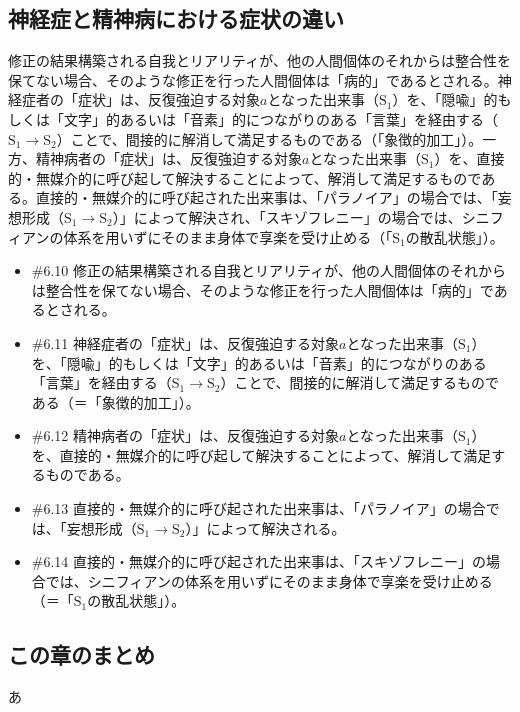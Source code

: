 \subsection{神経症と精神病における症状の違い}\label{ux795eux7d4cux75c7ux3068ux7cbeux795eux75c5ux306bux304aux3051ux308bux75c7ux72b6ux306eux9055ux3044}

修正の結果構築される自我とリアリティが、他の人間個体のそれからは整合性を保てない場合、そのような修正を行った人間個体は「病的」であるとされる。神経症者の「症状」は、反復強迫する対象\(a\)となった出来事（\(\textrm{S}_1\)）を、「隠喩」的もしくは「文字」的あるいは「音素」的につながりのある「言葉」を経由する（\(\textrm{S}_1\rightarrow\textrm{S}_2\)）ことで、間接的に解消して満足するものである（「象徴的加工」）。一方、精神病者の「症状」は、反復強迫する対象\(a\)となった出来事（\(\textrm{S}_1\)）を、直接的・無媒介的に呼び起して解決することによって、解消して満足するものである。直接的・無媒介的に呼び起された出来事は、「パラノイア」の場合では、「妄想形成（\(\textrm{S}_1\rightarrow\textrm{S}_2\)）」によって解決され、「スキゾフレニー」の場合では、シニフィアンの体系を用いずにそのまま身体で享楽を受け止める（「\(\textrm{S}_1\)の散乱状態」）。

\begin{note}{}
  \begin{itemize}
    \tightlist
    \item{\#6.10}
      修正の結果構築される自我とリアリティが、他の人間個体のそれからは整合性を保てない場合、そのような修正を行った人間個体は「病的」であるとされる。
    \item{\#6.11}
      神経症者の「症状」は、反復強迫する対象$a$となった出来事（$\textrm{S}_1$）を、「隠喩」的もしくは「文字」的あるいは「音素」的につながりのある「言葉」を経由する（$\textrm{S}_1\rightarrow\textrm{S}_2$）ことで、間接的に解消して満足するものである（＝「象徴的加工」）。
    \item{\#6.12}
      精神病者の「症状」は、反復強迫する対象$a$となった出来事（$\textrm{S}_1$）を、直接的・無媒介的に呼び起して解決することによって、解消して満足するものである。
    \item{\#6.13}
      直接的・無媒介的に呼び起された出来事は、「パラノイア」の場合では、「妄想形成（$\textrm{S}_1\rightarrow\textrm{S}_2$）」によって解決される。
    \item{\#6.14}
      直接的・無媒介的に呼び起された出来事は、「スキゾフレニー」の場合では、シニフィアンの体系を用いずにそのまま身体で享楽を受け止める（＝「$\textrm{S}_1$の散乱状態」）。
  \end{itemize}
\end{note}

\subsection{この章のまとめ}\label{ux3053ux306eux7ae0ux306eux307eux3068ux3081}

あ
